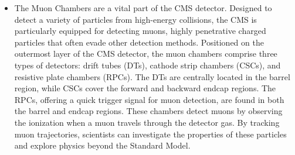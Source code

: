 \begin{itemize}


\item The Muon Chambers \cite{CMS:2018rym} are a vital part of the CMS detector. Designed to detect a variety of particles from high-energy collisions, the CMS is particularly equipped for detecting muons, highly penetrative charged particles that often evade other detection methods. Positioned on the outermost layer of the CMS detector, the muon chambers comprise three types of detectors: drift tubes (DTs), cathode strip chambers (CSCs), and resistive plate chambers (RPCs). The DTs are centrally located in the barrel region, while CSCs cover the forward and backward endcap regions. The RPCs, offering a quick trigger signal for muon detection, are found in both the barrel and endcap regions. These chambers detect muons by observing the ionization when a muon travels through the detector gas. By tracking muon trajectories, scientists can investigate the properties of these particles and explore physics beyond the Standard Model.




\end{itemize}
